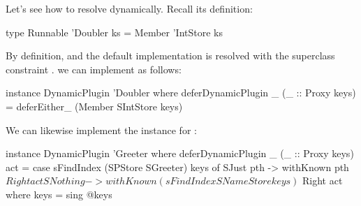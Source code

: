 \documentclass[demotion-paper.tex]{subfiles}
\begin{document}
Let's see how to resolve  dynamically.
Recall its definition:
\begin{code}
type Runnable 'Doubler ks = Member 'IntStore ks
\end{code}
By definition,  and the default implementation is resolved with the superclass constraint .
we can implement  as follows:
\begin{code}
instance DynamicPlugin 'Doubler where
  deferDynamicPlugin _ (_ :: Proxy keys) =
    deferEither_ (Member SIntStore keys)
\end{code}
We can likewise implement the instance for :
\begin{code}
instance DynamicPlugin 'Greeter where
  deferDynamicPlugin _ (_ :: Proxy keys) act =
    case sFindIndex (SPStore SGreeter) keys of
      SJust pth -> withKnown pth $ Right act
      SNothing ->
        withKnown (sFindIndex SNameStore keys) $
          Right act
    where keys = sing @keys
\end{code}
\end{document}
